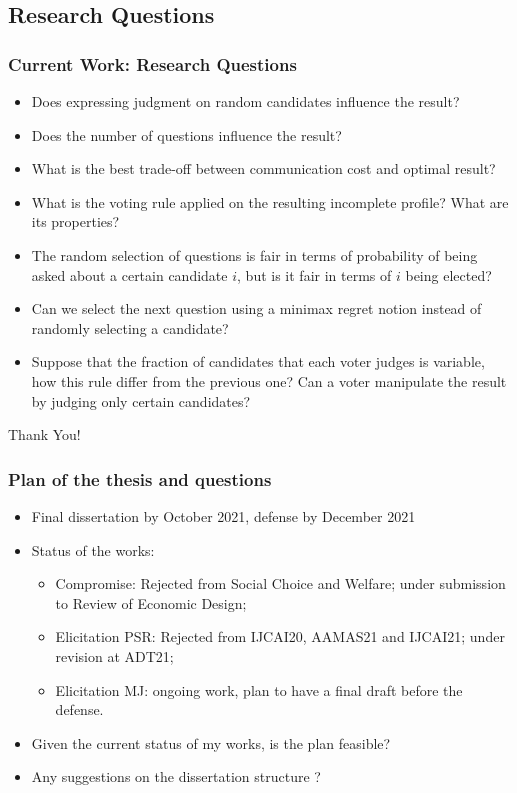 \documentclass{beamer}
\begin{document}
\subsection{Research Questions}
\begin{frame}
	\frametitle{\textbf{Current Work:} Research Questions}
	\begin{itemize}
		\item<1-> Does expressing judgment on random candidates influence the result? 
		\item<2-> Does the number of questions influence the result? 
		\item<3-> What is the best trade-off between communication cost and optimal result?
		\item<4-> What is the voting rule applied on the resulting incomplete profile? What are its properties?
		\item<5-> The random selection of questions is fair in terms of probability of being asked about a certain candidate $i$, but is it fair in terms of $i$ being elected?
		\item<6-> Can we select the next question using a minimax regret notion instead of randomly selecting a candidate?
		\item<7-> Suppose that the fraction of candidates that each voter judges is variable, how this rule differ from the previous one? Can a voter manipulate the result by judging only certain candidates?
	\end{itemize}
\end{frame}


\addtocounter{framenumber}{-1}
\begin{frame}[plain]
	\centering \color{darkred}\LARGE Thank You!
\end{frame}

\begin{frame}
	\frametitle{Plan of the thesis and questions}
	\begin{itemize}
		\item Final dissertation by October 2021, defense by December 2021
		\item Status of the works:
		\begin{itemize}
			\item Compromise: Rejected from Social Choice and Welfare; under submission to Review of Economic Design;
			\item Elicitation PSR: Rejected from IJCAI20, AAMAS21 and IJCAI21; under revision at ADT21;
			\item Elicitation MJ: ongoing work, plan to have a final draft before the defense.
		\end{itemize}
		\item Given the current status of my works, is the plan feasible?
		\item Any suggestions on the dissertation structure ?
	\end{itemize}
\end{frame}
\end{document}
